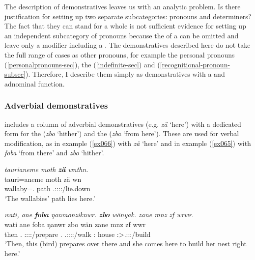 The description of demonstratives leaves us with an analytic problem. Is there justification for setting up two separate subcategories:  pronouns and  determiners? The fact that they can stand for a whole  is not sufficient evidence for setting up an independent subcategory of  pronouns because the  of a  can be omitted and leave only a modifier including a  . The demonstratives described here do not take the full range of cases as other pronouns, for example the personal pronouns (\ref{personalpronouns-sec}), the  (\ref{indefinite-sec}) and   (\ref{recognitional-pronoun-subsec}). Therefore, I describe them simply as demonstratives with a  and adnominal function.

\subsubsection{Adverbial demonstratives} \label{adverbial-demonstratives-subsec}

 includes a column of adverbial demonstratives (e.g. \emph{zä} `here') with a dedicated form for the  (\emph{zbo} `hither') and the   (\emph{zba} `from here'). These are used for verbal modification, as in example (\ref{ex066}) with \emph{zä} `here' and in example (\ref{ex065}) with \emph{foba} `from there' and \emph{zbo} `hither'.

\begin{exe}
	\ex \emph{taurianeme moth \textbf{zä} wnthn.}\\
	\gll tauri=aneme moth zä wn\\
	wallaby=\Poss.{\Nsg} path {\Prox} \Tsg.\F:\Sbj:\Nonpast:\Ipfv:\Venit/lie.down\\
	\trans `The wallabies' path lies here.' 
	\label{ex066}
\end{exe}
\begin{exe}
	\ex \emph{wati, ane \textbf{foba} ŋanmonziknwr. \textbf{zbo} wänyak. zane mnz zf wrwr.}\\
	\gll wati ane foba ŋanwr zbo wän zane mnz zf wwr\\
	then {\Dem} \Dist.{\Abl} \Stsg:\Sbj:\Nonpast:\Ipfv:\Venit/prepare \Prox.{\All} \Tsg.\F:\Sbj:\Nonpast:\Ipfv:\Venit/walk \Dem:{\Prox} house {\Imm} \Stsg:\Sbj>\Tsg.\F:\Obj:\Nonpast:\Ipfv/build\\
	\trans `Then, this (bird) prepares over there and she comes here to build her nest right here.' 
	\label{ex065}
\end{exe}


